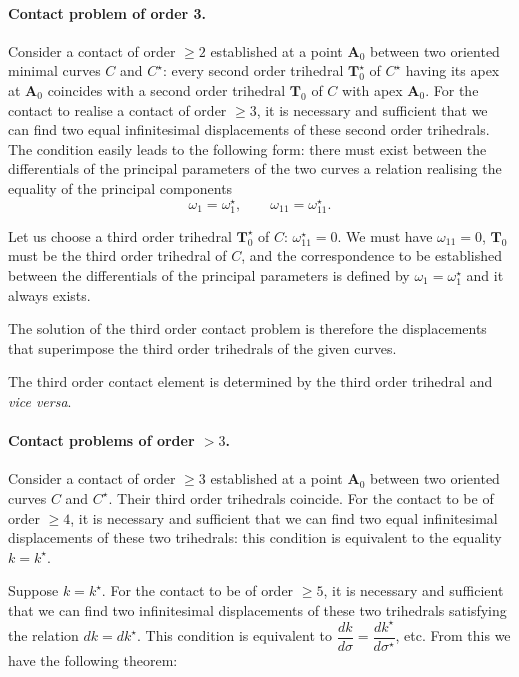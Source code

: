 \documentclass[leqno,11pt]{book}
\numberwithin{equation}{chapter}
\theoremstyle{shape1}
\theoremstyle{shapesmall}
\newcommand{\str}{^{\star}}
\begin{document}
\paragraph{Contact problem of order 3.}
\label{sec:34}
Consider a contact of order $\ge 2$ established at a point $\mathbf{A}_{0}$ between two oriented minimal curves $C$ and $C\str$: every second order trihedral $\mathbf{T}\str_{0}$ of $C\str$ having its apex at $\mathbf{A}_{0}$ coincides with a second order trihedral $\mathbf{T}_{0}$ of $C$ with apex $\mathbf{A}_{0}$. For the contact to realise a contact of order $\ge 3$, it is necessary and sufficient that we can find two equal infinitesimal displacements of these second order trihedrals. The condition easily leads to the following form: there must exist between the differentials of the principal parameters of the two curves a relation realising the equality of the principal components
\[
\omega_{1}=\omega_{1}\str,\qquad\omega_{11}=\omega_{11}\str.
\]

Let us choose a third order trihedral $\mathbf{T}\str_{0}$ of $C$: $\omega_{11}\str=0$. We must have $\omega_{11}=0$, $\mathbf{T}_{0}$ must be the third order trihedral of ${C}$, and the correspondence to be established between the differentials of the principal parameters is defined by $\omega_{1}=\omega_{1}\str$ and it always exists.

The solution of the third order contact problem is therefore the displacements that superimpose the third order trihedrals of the given curves.

The third order contact element is determined by the third order trihedral and \emph{vice versa}.

\paragraph{Contact problems of order $>3$.}
\label{sec:35}
Consider a contact of order $\ge 3$ established at a point $\mathbf{A}_{0}$ between two oriented curves $C$ and $C\str$. Their third order trihedrals coincide. For the contact to be of order $\ge 4$, it is necessary and sufficient that we can find two equal infinitesimal displacements of these two trihedrals: this condition is equivalent to the equality $k=k\str$.

Suppose $k=k\str$. For the contact to be of order $\ge 5$, it is necessary and sufficient that we can find two infinitesimal displacements of these two trihedrals satisfying the relation $dk=dk\str$. This condition is equivalent to $\dfrac{dk}{d\sigma}=\dfrac{dk\str}{d\sigma\str}$, etc. From this we have the following theorem:
\end{document}
